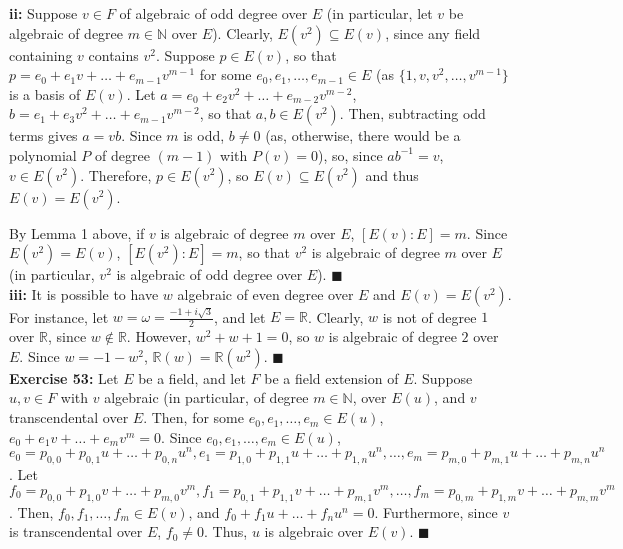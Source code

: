 \documentclass{article}%
\begin{document}
\textbf{ii:} Suppose $v \in F$ of algebraic of odd degree over $E$ (in
particular, let $v$ be algebraic of degree $m \in \mathbb{N}$ over $E$).
Clearly, $E(v^2) \subseteq E(v)$, since any field containing $v$ contains
$v^2$. Suppose $p \in E(v)$, so that $p = e_0 + e_1v + \ldots +
e_{m - 1}v^{m - 1}$ for some $e_0, e_1, \ldots, e_{m - 1} \in E$ (as $\{1,
v, v^2, \ldots, v^{m - 1}\}$ is a basis of $E(v)$. Let
$a = e_0 + e_2v^2 + \ldots + e_{m - 2}v^{m - 2}$,
$b = e_1 + e_3v^2 + \ldots + e_{m - 1}v^{m - 2}$, so that $a, b \in E(v^2)$.
Then, subtracting odd terms gives $a = vb$. Since $m$ is odd, $b \neq 0$
(as, otherwise, there would be a polynomial $P$ of degree $(m - 1)$ with
$P(v) = 0$), so, since $ab^{-1} = v$, $v \in E(v^2)$. Therefore, $p \in
E(v^2)$, so $E(v) \subseteq E(v^2)$ and thus $E(v) = E(v^2)$.

By Lemma 1 above, if $v$ is algebraic of degree $m$ over $E$,
$[E(v) : E] = m$. Since $E(v^2) = E(v)$, $[E(v^2) : E] = m$, so that $v^2$ is
algebraic of degree $m$ over $E$ (in particular, $v^2$ is algebraic of odd
degree over $E$). \qquad $\blacksquare$ \\

\textbf{iii:} It is possible to have $w$ algebraic of even degree over $E$ and
$E(v) = E(v^2)$. For instance, let $w = \omega = \frac{-1 + i\sqrt{3}}{2}$,
and let $E = \mathbb{R}$. Clearly, $w$ is not of degree $1$ over $\mathbb{R}$,
since $w \not \in \mathbb{R}$. However, $w^2 + w + 1 = 0$, so $w$ is algebraic
of degree $2$ over $E$. Since $w = -1 - w^2$, $\mathbb{R}(w) =
\mathbb{R}(w^2)$. \qquad $\blacksquare$ \\

\textbf{Exercise 53:} Let $E$ be a field, and let $F$ be a field extension of
$E$. Suppose $u, v \in F$ with $v$ algebraic (in particular, of degree $m \in
\mathbb{N}$, over $E(u)$, and $v$ transcendental over $E$. Then, for some
$e_0, e_1, \ldots, e_m \in E(u)$, $e_0 + e_1v + \ldots + e_mv^m = 0$.
Since $e_0, e_1, \ldots, e_m \in E(u)$, $e_0 = p_{0,0} + p_{0,1}u + \ldots +
p_{0,n}u^n, e_1 = p_{1,0} + p_{1,1}u + \ldots + p_{1,n}u^n, \ldots,
e_m = p_{m,0} + p_{m,1}u + \ldots + p_{m,n}u^n$. Let $f_0 = p_{0,0} + p_{1,0}v
 + \ldots + p_{m, 0}v^m, f_1 = p_{0,1} + p_{1,1}v + \ldots + p_{m, 1}v^m,
\ldots, f_m = p_{0,m} + p_{1,m}v  + \ldots + p_{m, m}v^m$. Then, $f_0, f_1,
\ldots, f_m \in E(v)$, and $f_0 + f_1u + \ldots + f_nu^n = 0$. Furthermore,
since $v$ is transcendental over $E$, $f_0 \neq 0$. Thus, $u$ is algebraic
over $E(v)$. \qquad $\blacksquare$ \\
\end{document}
